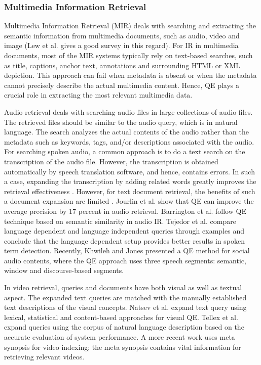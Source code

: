 \subsubsection{Multimedia Information Retrieval}
Multimedia Information Retrieval (MIR) deals with searching and extracting the semantic information from multimedia documents, such as audio, video and image (Lew et al. \cite{lew2006content} gives a good survey in this regard). For IR in multimedia documents, most of the MIR systems typically rely on text-based searches, such as title, captions, anchor text, annotations and surrounding HTML or XML depiction. This approach can fail when metadata is absent or when the metadata cannot precisely describe the actual multimedia content. Hence, QE plays a crucial role in extracting the most relevant multimedia data.

Audio retrieval deals with searching audio files in large collections of audio files. The retrieved files should be similar to the audio query, which is in natural language. The search analyzes the actual contents of the audio rather than the metadata such as keywords, tags, and/or descriptions associated with the audio.
For searching spoken audio, a common approach is to do a text search on the transcription of the audio file. However, the transcription is obtained automatically by speech translation software, and hence, contains errors. In such a case, expanding the transcription by adding related words greatly improves the retrieval effectiveness \cite{singhal1999document}. However, for text document retrieval, the benefits of such a document expansion are limited  \cite{wei2007modeling}.
Jourlin et al. \cite{jourlin1999general} show that QE can improve the average precision by 17 percent in audio retrieval. Barrington et al. \cite{barrington2007audio} follow QE technique based on semantic similarity in audio IR. Tejedor et al. \cite{tejedor2012comparison} compare language dependent and language independent queries through examples and conclude that the language dependent setup provides better results in spoken term detection. Recently, Khwileh and Jones \cite{khwileh2016investigating} presented a QE method for social audio contents, where the QE approach uses three speech segments: semantic, window and discourse-based segments.

In video retrieval, queries and documents have both visual as well as textual aspect. The expanded text queries are matched with the manually established text descriptions of the visual concepts. Natsev et al. \cite{natsev2007semantic} expand text query using lexical, statistical and content-based approaches for visual QE. Tellex et al. \cite{tellex2010grounding} expand queries using the corpus of natural language description based on the accurate evaluation of system performance. A more recent work \cite{thomas2016perceptual} uses meta synopsis for video indexing; the meta synopsis contains vital information for retrieving relevant videos. 


